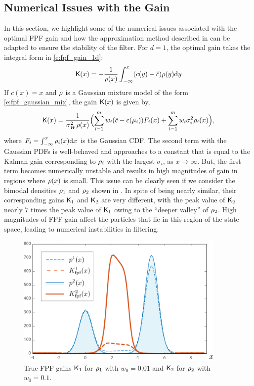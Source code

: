 \subsection{Numerical Issues with the Gain}
\label{s:fpf_numerical}
In this section, we highlight some of the numerical issues associated with the optimal FPF gain and how the approximation method described in  can be adapted to ensure the stability of the filter. For $d=1$, the optimal gain takes the integral form in \eqref{e:fpf_gain_1d}:
\[
\text{\sf K}(x) = - \frac{1}{\rho(x)} \int_{-\infty}^{x} (c(y) - \hat{c}) \rho(y) \text{d} y
\]
If $c(x) = x$ and $\rho$ is a Gaussian mixture model of the form \eqref{e:fpf_gaussian_mix}, the gain $\text{\sf K}(x)$ is given by,
\begin{equation}
\kFPF(x) = \frac{1}{\sigma^2_W \pr(x)} \Bigl( \sum_{i=1}^m w_i (\hac - c(\mu_i)) F_i(x) + \sum_{i=1}^m w_i\sigma^2_i \pr_i(x)\Bigr),
\label{e:fpf_gain_gmm}
\end{equation}
where $F_i = \int_{-\infty}^{x} \rho_i(x) \text{d} x$ is the Gaussian CDF. The second term with the Gaussian PDFs is well-behaved and approaches to a constant that is equal to the Kalman gain corresponding to $\rho_i$ with the largest $\sigma_i$, as $x \to \infty$. But, the first term becomes numerically unstable and results in high magnitudes of gain in regions where $\rho(x)$ is small. This issue can be clearly seen if we consider the bimodal densities $\rho_1$ and $\rho_2$ shown in . In spite of being nearly similar, their corresponding gains $\text{\sf K}_1$ and $\text{\sf K}_2$ are very different, with the peak value of $\text{\sf K}_2$ nearly $7$ times the peak value of $\text{\sf K}_1$ owing to the ``deeper valley'' of $\rho_2$. High magnitudes of FPF gain affect the particles that lie in this region of the state space, leading to numerical instabilities in filtering.

\begin{figure}[htbp]
\centering
\includegraphics[width = 4in]{images/Chap4_Fig_gain_comparison}
	\caption{True FPF gains $\text{\sf K}_1$ for $\rho_1$ with $w_{0}=0.01$ and $\text{\sf K}_2$ for $\rho_2$ with $w_{0}=0.1$.}
	\label{fig:fpf_gain_num_issues}
\end{figure}


